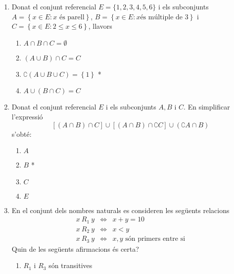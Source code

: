 \begin{enumerate}
\item Donat el conjunt referencial $E=\{1,2,3,4,5,6\}$ i els subconjunts $%
A=\left\{ x\in E:x\text{ \'{e}s parell}\right\} $, $B=\left\{ x\in E:x\text{
\'{e}s m\'{u}ltiple de 3}\right\} $ i $C=\left\{ x\in E:2\leq x\leq6\right\}
$, llavors

\begin{enumerate}
\item $A\cap B\cap C=\emptyset$

\item $\left( A\cup B\right) \cap C=C$

\item $\complement \left( A\cup B\cup C\right) =\left\{ 1\right\} $ *

\item $A\cup(B\cap C)=C$
\end{enumerate}

\item Donat el conjunt referencial $E$ i els subconjunts $A,B$ i $C$. En
simplificar l'expressi\'{o}%
\begin{equation*}
\left[ (A\cap B)\cap C\right] \cup\left[ (A\cap B)\cap\complement C\right]
\cup\left( \complement A\cap B\right)
\end{equation*}
s'obt\'{e}:

\begin{enumerate}
\item $A$

\item $B$ *

\item $C$

\item $E$
\end{enumerate}

\item En el conjunt dels nombres naturals es consideren les seg\"{u}ents
relacions%
\begin{equation*}
\begin{array}{lll}
x~R_{1}~y & \Longleftrightarrow & x+y=10 \\
x~R_{2}~y & \Longleftrightarrow & x<y \\
x~R_{3}~y & \Longleftrightarrow & x,y\text{ s\'{o}n primers entre si}%
\end{array}%
\end{equation*}
Quin de les seg\"{u}ents afirmacions \'{e}s certa?

\begin{enumerate}
\item $R_{1}$ i $R_{3}$ s\'{o}n transitives


\end{enumerate}
\end{enumerate}
